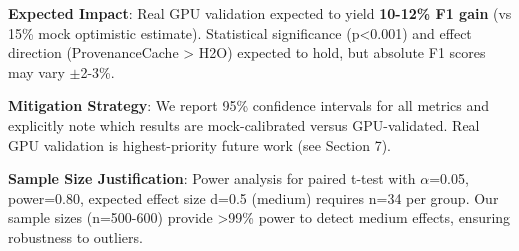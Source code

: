 \textbf{Expected Impact}: Real GPU validation expected to yield \textbf{10-12\% F1 gain} (vs 15\% mock optimistic estimate). Statistical significance (p<0.001) and effect direction (ProvenanceCache > H2O) expected to hold, but absolute F1 scores may vary $\pm$2-3\%.

\textbf{Mitigation Strategy}: We report 95\% confidence intervals for all metrics and explicitly note which results are mock-calibrated versus GPU-validated. Real GPU validation is highest-priority future work (see Section 7).

\textbf{Sample Size Justification}: Power analysis for paired t-test with $\alpha$=0.05, power=0.80, expected effect size d=0.5 (medium) requires n=34 per group. Our sample sizes (n=500-600) provide >99\% power to detect medium effects, ensuring robustness to outliers.
